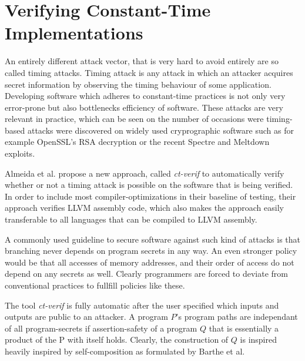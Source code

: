 \documentclass[a4paper,UKenglish]{lipics-v2018}
\begin{document}


\section{Verifying Constant-Time Implementations}

An entirely different attack vector, that is very hard to avoid entirely are so called timing attacks. Timing attack is any attack in which an attacker acquires secret information by observing the timing behaviour of some application. Developing software which adheres to constant-time practices is not only very error-prone but also bottlenecks efficiency of software. These attacks are very relevant in practice, which can be seen on the number of occasions were timing-based attacks were discovered on widely used cryprographic software such as for example OpenSSL's RSA decryption\cite{verifying_constant_time_implementations} or the recent Spectre and Meltdown exploits.\cite{spectre,meltdown} 


Almeida et al. propose a new approach, called \textit{ct-verif} to automatically verify whether  or not a timing attack is possible on the software that is being verified. In order to include most compiler-optimizations in their baseline of testing, their approach verifies LLVM assembly code, which also makes the approach easily transferable to all languages that can be compiled to LLVM assembly.\cite{verifying_constant_time_implementations}

A commonly used guideline to secure software against such kind of attacks is that branching never depends on program secrets in any way. An even stronger policy would be that all accesses of memory addresses, and their order of access do not depend on any secrets as well. Clearly programmers are forced to deviate from conventional practices to fullfill policies like these.\cite{verifying_constant_time_implementations}

The tool \textit{ct-verif} is fully automatic after the user specified which inputs and outputs are public to an attacker. A program $P$'s program paths are independant of all program-secrets if assertion-safety of a program $Q$ that is essentially a product of the P with itself holds.\cite{verifying_constant_time_implementations} Clearly, the construction of $Q$ is inspired heavily inspired by self-composition as formulated by Barthe et al.\cite{information_flow_by_self_composition} 
\end{document}
